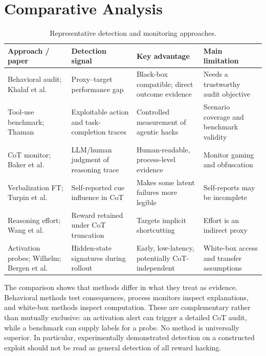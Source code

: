 \documentclass[sigconf,nonacm]{acmart}
\begin{document}
\section{Comparative Analysis}
\begin{table}[t]
\caption{Representative detection and monitoring approaches.}
\label{tab:comparison}
\scriptsize
\setlength{\tabcolsep}{2pt}
\begin{tabular}{p{}p{}p{}p{}}
\toprule
Approach / paper & Detection signal & Key advantage & Main limitation\\
\midrule
Behavioral audit; Khalaf et al. & Proxy--target performance gap & Black-box compatible; direct outcome evidence & Needs a trustworthy audit objective\\
Tool-use benchmark; Thaman & Exploitable action and task-completion traces & Controlled measurement of agentic hacks & Scenario coverage and benchmark validity\\
CoT monitor; Baker et al. & LLM/human judgment of reasoning trace & Human-readable, process-level evidence & Monitor gaming and obfuscation\\
Verbalization FT; Turpin et al. & Self-reported cue influence in CoT & Makes some latent failures more legible & Self-reports may be incomplete\\
Reasoning effort; Wang et al. & Reward retained under CoT truncation & Targets implicit shortcutting & Effort is an indirect proxy\\
Activation probes; Wilhelm; Bergen et al. & Hidden-state signatures during rollout & Early, low-latency, potentially CoT-independent & White-box access and transfer assumptions\\
\bottomrule
\end{tabular}
\end{table}

The comparison shows that methods differ in what they treat as evidence. Behavioral methods test consequences, process monitors inspect explanations, and white-box methods inspect computation. These are complementary rather than mutually exclusive: an activation alert can trigger a detailed CoT audit, while a benchmark can supply labels for a probe. No method is universally superior. In particular, experimentally demonstrated detection on a constructed exploit should not be read as general detection of all reward hacking.
\end{document}

